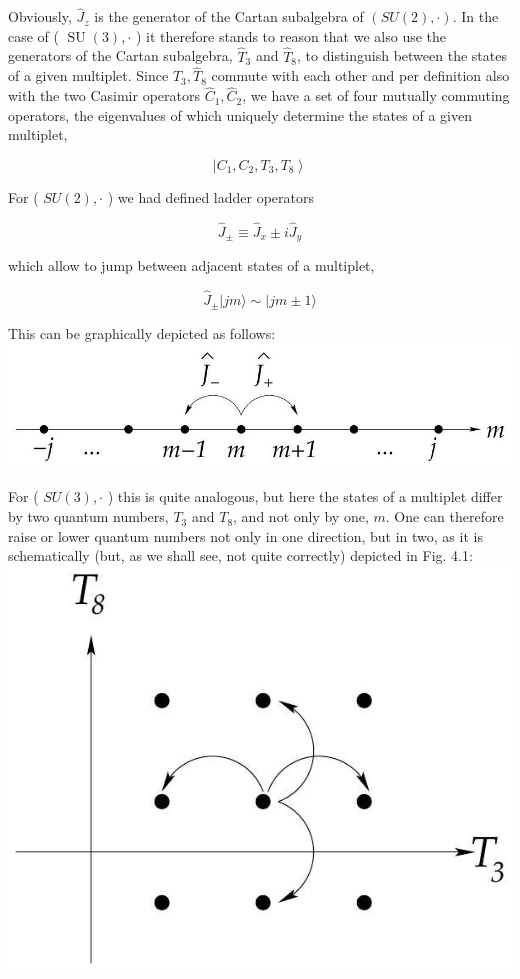 \documentclass[10pt, letterpaper]{article}
\begin{document}
Obviously, $\hat{J}_{z}$ is the generator of the Cartan subalgebra of $(S U(2), \cdot)$. In the case of ( $\operatorname{SU}(3), \cdot$ ) it therefore stands to reason that we also use the generators of the Cartan subalgebra, $\hat{T}_{3}$ and $\hat{T}_{8}$, to distinguish between the states of a given multiplet. Since $\hat{T}_{3}, \hat{T}_{8}$ commute with each other and per definition also with the two Casimir operators $\hat{C}_{1}, \hat{C}_{2}$, we have a set of four mutually commuting operators, the eigenvalues of which uniquely determine the states of a given multiplet,

$$
\left|C_{1}, C_{2}, T_{3}, T_{8}\right\rangle
$$

For ( $S U(2), \cdot$ ) we had defined ladder operators

$$
\hat{J}_{ \pm} \equiv \hat{J}_{x} \pm i \hat{J}_{y}
$$

which allow to jump between adjacent states of a multiplet,

$$
\hat{J}_{ \pm}|j m\rangle \sim|j m \pm 1\rangle
$$

This can be graphically depicted as follows:\\
\includegraphics[scale=0.3, center]{2025_05_20_8618f55a41bfe980b4b2g-43}

For ( $S U(3), \cdot$ ) this is quite analogous, but here the states of a multiplet differ by two quantum numbers, $T_{3}$ and $T_{8}$, and not only by one, $m$. One can therefore raise or lower quantum numbers not only in one direction, but in two, as it is schematically (but, as we shall see, not quite correctly) depicted in Fig. 4.1:\\
\includegraphics[scale=0.3, center]{2025_05_20_8618f55a41bfe980b4b2g-44}
\end{document}
